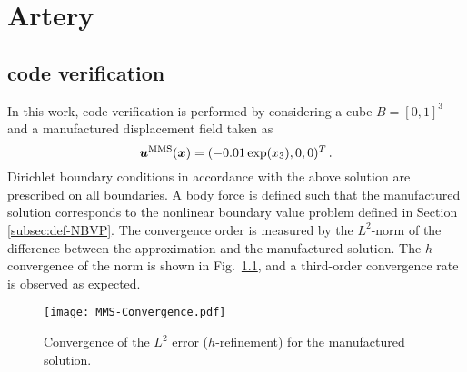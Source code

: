 \appendixtitleon

\chapter{Artery}

\section{code verification}
\label{app:VV-artery}


In this work, code verification is performed by considering a cube $B = [0,1]^3$ and a manufactured displacement field taken as 
\begin{equation}
    \boldsymbol{u}^{\textnormal{MMS}}(\boldsymbol{x}) = (-0.01\exp(x_3), 0, 0)^T\,.
\end{equation}
Dirichlet boundary conditions in accordance with the above solution are prescribed on all boundaries. A body force is defined such that the manufactured solution corresponds to the nonlinear boundary value problem defined in Section \ref{subsec:def-NBVP}. The convergence order is measured by the $L^2$-norm of the difference between the approximation and the manufactured solution. The $h$-convergence of the norm is shown in Fig.~\ref{fig:mms}, and a third-order convergence rate is observed as expected.
\begin{figure}[ht!]
    \begin{center}
        \texttt{[image: MMS-Convergence.pdf]}
    \end{center}
    \caption[Convergence of the $L^2$ error for the manufactured solution.]{Convergence of the $L^2$ error ($h$-refinement) for the manufactured solution.}
    \label{fig:mms}
\end{figure}

